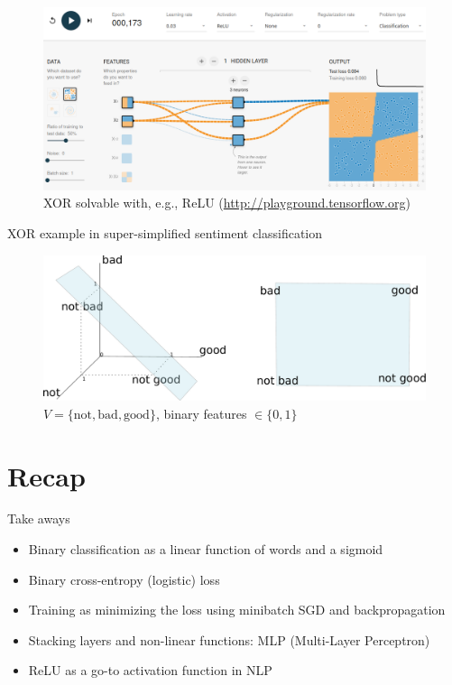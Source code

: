 \documentclass[12pt,aspectratio=169,handout]{beamer}
\begin{document}
\begin{frame}
	\begin{figure}
		\vspace{-1.3em}
		\includegraphics[width=1.35\linewidth]{img/linear4.png}	
		\caption{XOR solvable with, e.g., ReLU (\url{http://playground.tensorflow.org})}
	\end{figure}	
\end{frame}


\begin{frame}{XOR example in super-simplified sentiment classification}
	\begin{figure}
		\vspace{-1.3em}
		\includegraphics[width=1.2\linewidth]{img/xor1.pdf}	
		\caption{$V = \{\text{not}, \text{bad}, \text{good}\}$, binary features $\in \{0, 1\}$}
	\end{figure}	
\end{frame}



\section*{Recap}

\begin{frame}{Take aways}
	
	\begin{itemize}
		\item Binary classification as a linear function of words and a sigmoid
		\item Binary cross-entropy (logistic) loss
		\item Training as minimizing the loss using minibatch SGD and backpropagation
		\item Stacking layers and non-linear functions: MLP (Multi-Layer Perceptron)
		\item ReLU as a go-to activation function in NLP
	\end{itemize}
	
\end{frame}
\end{document}
